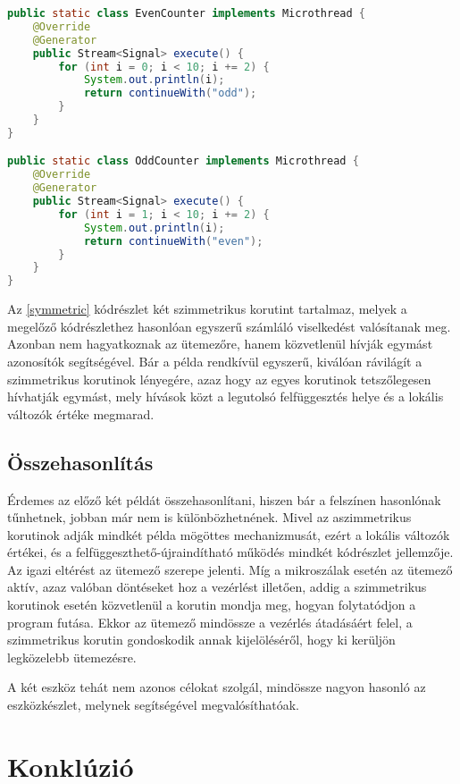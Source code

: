 \begin{lstlisting}[language=Java, caption={Számlálás szimmetrikus korutinokkal}, escapechar=!, captionpos=b, aboveskip=1em, label=symmetric]
public static class EvenCounter implements Microthread {
    @Override
    @Generator
    public Stream<Signal> execute() {
        for (int i = 0; i < 10; i += 2) {
            System.out.println(i);
            return continueWith("odd");
        }
    }
}

public static class OddCounter implements Microthread {
    @Override
    @Generator
    public Stream<Signal> execute() {
        for (int i = 1; i < 10; i += 2) {
            System.out.println(i);
            return continueWith("even");
        }
    }
}
\end{lstlisting} 

Az \ref{symmetric} kódrészlet két szimmetrikus korutint tartalmaz, melyek a megelőző kódrészlethez hasonlóan egyszerű számláló viselkedést valósítanak meg. Azonban nem hagyatkoznak az ütemezőre, hanem közvetlenül hívják egymást azonosítók segítségével. Bár a példa rendkívül egyszerű, kiválóan rávilágít a szimmetrikus korutinok lényegére, azaz hogy az egyes korutinok tetszőlegesen hívhatják egymást, mely hívások közt a legutolsó felfüggesztés helye és a lokális változók értéke megmarad.

\subsection{Összehasonlítás}

Érdemes az előző két példát összehasonlítani, hiszen bár a felszínen hasonlónak tűnhetnek, jobban már nem is különbözhetnének. Mivel az aszimmetrikus korutinok adják mindkét példa mögöttes mechanizmusát, ezért a lokális változók értékei, és a felfüggeszthető-újraindítható működés mindkét kódrészlet jellemzője. Az igazi eltérést az ütemező szerepe jelenti. Míg a mikroszálak esetén az ütemező aktív, azaz valóban döntéseket hoz a vezérlést illetően, addig a szimmetrikus korutinok esetén közvetlenül a korutin mondja meg, hogyan folytatódjon a program futása. Ekkor az ütemező mindössze a vezérlés átadásáért felel, a szimmetrikus korutin gondoskodik annak kijelöléséről, hogy ki kerüljön legközelebb ütemezésre.

A két eszköz tehát nem azonos célokat szolgál, mindössze nagyon hasonló az eszközkészlet, melynek segítségével megvalósíthatóak.

\section{Konklúzió}

